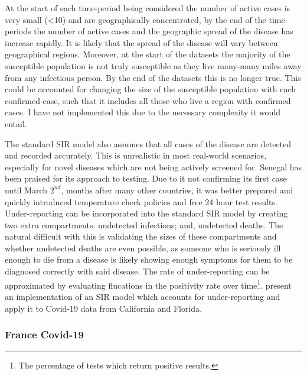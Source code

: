 \documentclass[11pt,a4paper]{article}
\theoremstyle{break}
\begin{document}
  \par At the start of each time-period being considered the number of active cases is very small (<10) and are geographically concentrated, by the end of the time-periods the number of active cases and the geographic spread of the disease has increase rapidly. It is likely that the spread of the disease will vary between geographical regions. Moreover, at the start of the datasets the majority of the susceptible population is not truly susceptible as they live many-many miles away from any infectious person. By the end of the datasets this is no longer true. This could be accounted for changing the size of the susceptible population with each confirmed case, such that it includes all those who live a region with confirmed cases. I have not implemented this due to the necessary complexity it would entail.

  \par The standard SIR model also assumes that all cases of the disease are detected and recorded accurately. This is unrealistic in most real-world scenarios, especially for novel diseases which are not being actively screened for. Senegal has been praised for its approach to testing. Due to it not confirming its first case until March $2^{nd}$, months after many other countries, it was better prepared and quickly introduced temperature check policies and free 24 hour test results. Under-reporting can be incorporated into the standard SIR model by creating two extra compartments: undetected infections; and, undetected deaths. The natural difficult with this is validating the sizes of these compartments and whether undetected deaths are even possible, as someone who is seriously ill enough to die from a disease is likely showing enough symptoms for them to be diagnosed correctly with said disease. The rate of under-reporting can be approximated by evaluating flucations in the positivity rate over time\footnote{The percentage of tests which return positive results.}. \cite[]{sir_model_underreporting} present an implementation of an SIR model which accounts for under-reporting and apply it to Covid-19 data from California and Florida.

\subsubsection{France Covid-19}\label{sec_real_data_france}

\end{document}
